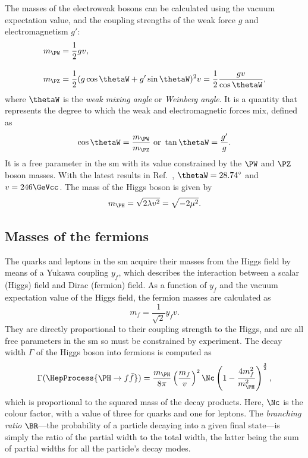 The masses of the electroweak bosons can be calculated using the vacuum expectation value, and the coupling strengths of the weak force $g$ and electromagnetism $g'$:
\begin{equation}
    \begin{aligned}
m_{\PW} &= \frac{1}{2} gv, \\[1em]
m_{\PZ} &= \frac{1}{2} (g\cos\thetaW + g'\sin\thetaW)^2 v = \frac{1}{2}\frac{gv}{\cos\thetaW},
    \end{aligned}
    \label{eq:w_z_masses}
\end{equation}
where $\thetaW$ is the \emph{weak mixing angle} or \emph{Weinberg angle}. It is a quantity that represents the degree to which the weak and electromagnetic forces mix, defined as
\begin{equation}
    \cos\thetaW = \frac{m_{\PW}}{m_{\PZ}} \ \text{or} \ \tan\thetaW = \frac{g'}{g}.
    \label{eq:weak_mixing_angle}
\end{equation}
It is a free parameter in the \acrlong{sm} with its value constrained by the $\PW$ and $\PZ$ boson masses. With the latest results in Ref.~, $\thetaW = \text{28.74}^{\circ}$ and $v = \text{246}\GeVcc$. The mass of the Higgs boson is given by
\begin{equation}
    m_{\PH} = \sqrt{2\lambda v^2} = \sqrt{-2\mu^2}.
    \label{eq:higgs_mass}
\end{equation}




\subsection{Masses of the fermions}
\label{subsec:theory_fermion_masses}

The quarks and leptons in the \acrshort{sm} acquire their masses from the Higgs field by means of a Yukawa coupling $y_f$, which describes the interaction between a scalar (Higgs) field and Dirac (fermion) field. As a function of $y_f$ and the vacuum expectation value of the Higgs field, the fermion masses are calculated as
\begin{equation}
    m_f = \frac{1}{\sqrt{2}} y_f v.
    \label{eq:fermion_mass}
\end{equation}
They are directly proportional to their coupling strength to the Higgs, and are all free parameters in the \acrshort{sm} so must be constrained by experiment. The decay width $\Gamma$ of the Higgs boson into fermions is computed as
\begin{equation}
    \Gamma(\HepProcess{\PH \to f\bar{f}}) = \frac{m_{\PH}}{8\pi} \left( \frac{m_f}{v} \right)^2 \Nc \left( 1 - \frac{4 m_f^2}{m_{\PH}^2} \right)^{\frac{3}{2}},
    \label{eq:higgs_decay_width_fermions}
\end{equation}
which is proportional to the squared mass of the decay products. Here, $\Nc$ is the colour factor, with a value of three for quarks and one for leptons. The \emph{branching ratio} $\BR$---the probability of a particle decaying into a given final state---is simply the ratio of the partial width to the total width, the latter being the sum of partial widths for all the particle's decay modes.


